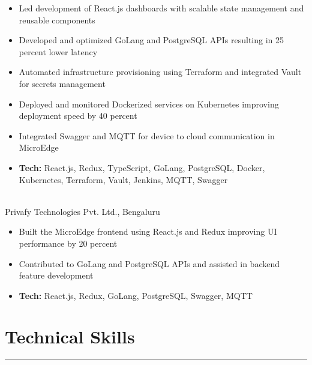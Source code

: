 \documentclass[a4paper,10pt]{article}
\begin{document}
\begin{itemize}[left=1em, label=\textbullet, itemsep=0.15em]

    \item Led development of React.js dashboards with scalable state management and reusable components

    \item Developed and optimized GoLang and PostgreSQL APIs resulting in 25 percent lower latency

    \item Automated infrastructure provisioning using Terraform and integrated Vault for secrets management

    \item Deployed and monitored Dockerized services on Kubernetes improving deployment speed by 40 percent

    \item Integrated Swagger and MQTT for device to cloud communication in MicroEdge


    \item \textbf{Tech:} React.js, Redux, TypeScript, GoLang, PostgreSQL, Docker, Kubernetes, Terraform, Vault, Jenkins, MQTT, Swagger

\end{itemize}

\noindent
{}\\
\hspace{0.8em}Privafy Technologies Pvt. Ltd., Bengaluru
\vspace{-0.6em}

\begin{itemize}[left=1em, label=\textbullet, itemsep=0.15em]

    \item Built the MicroEdge frontend using React.js and Redux improving UI performance by 20 percent

    \item Contributed to GoLang and PostgreSQL APIs and assisted in backend feature development


    \item \textbf{Tech:} React.js, Redux, GoLang, PostgreSQL, Swagger, MQTT

\end{itemize}


\section*{Technical Skills}
\vspace{-\baselineskip}
\noindent\rule{\textwidth}{0.1mm}
\end{document}
